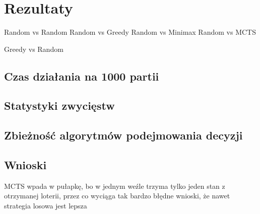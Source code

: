 \chapter{Rezultaty}
\label{cha:rozdz5}

Random vs Random
Random vs Greedy
Random vs Minimax
Random vs MCTS

Greedy vs Random

\section{Czas działania na 1000 partii}

\section{Statystyki zwycięstw}

\section{Zbieżność algorytmów podejmowania decyzji}

\section{Wnioski}
MCTS wpada w pułapkę, bo w jednym weźle trzyma tylko jeden stan z otrzymanej loterii, przez co wyciąga tak bardzo błędne wnioski, że nawet strategia losowa jest lepsza